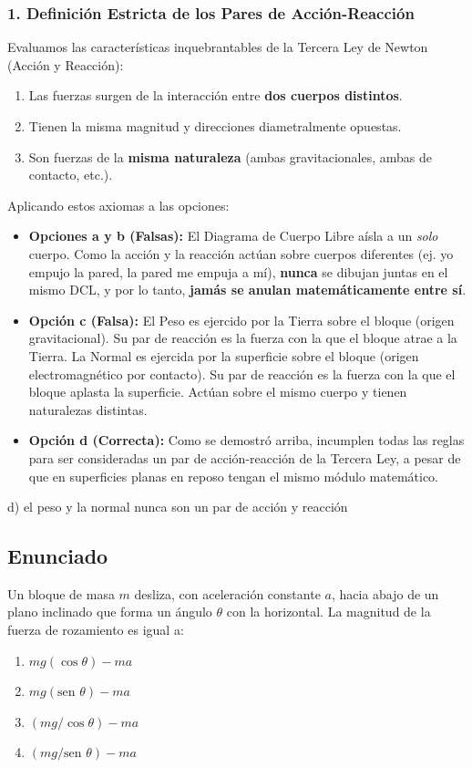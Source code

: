 \documentclass[12pt, a4paper]{article}
\begin{document}
\subsubsection*{1. Definición Estricta de los Pares de Acción-Reacción}
Evaluamos las características inquebrantables de la Tercera Ley de Newton (Acción y Reacción):
\begin{enumerate}
    \item Las fuerzas surgen de la interacción entre \textbf{dos cuerpos distintos}.
    \item Tienen la misma magnitud y direcciones diametralmente opuestas.
    \item Son fuerzas de la \textbf{misma naturaleza} (ambas gravitacionales, ambas de contacto, etc.).
\end{enumerate}

Aplicando estos axiomas a las opciones:
\begin{itemize}
    \item \textbf{Opciones a y b (Falsas):} El Diagrama de Cuerpo Libre aísla a un \textit{solo} cuerpo. Como la acción y la reacción actúan sobre cuerpos diferentes (ej. yo empujo la pared, la pared me empuja a mí), \textbf{nunca} se dibujan juntas en el mismo DCL, y por lo tanto, \textbf{jamás se anulan matemáticamente entre sí}.
    \item \textbf{Opción c (Falsa):} El Peso es ejercido por la Tierra sobre el bloque (origen gravitacional). Su par de reacción es la fuerza con la que el bloque atrae a la Tierra. La Normal es ejercida por la superficie sobre el bloque (origen electromagnético por contacto). Su par de reacción es la fuerza con la que el bloque aplasta la superficie. Actúan sobre el mismo cuerpo y tienen naturalezas distintas. 
    \item \textbf{Opción d (Correcta):} Como se demostró arriba, incumplen todas las reglas para ser consideradas un par de acción-reacción de la Tercera Ley, a pesar de que en superficies planas en reposo tengan el mismo módulo matemático.
\end{itemize}

\begin{tcolorbox}[colback=green!5!white, colframe=green!50!black, title=Respuesta Final]
\centering \Large d) el peso y la normal nunca son un par de acción y reacción
\end{tcolorbox}

\newpage

\subsection*{Enunciado}
Un bloque de masa $m$ desliza, con aceleración constante $a$, hacia abajo de un plano inclinado que forma un ángulo $\theta$ con la horizontal. La magnitud de la fuerza de rozamiento es igual a:
\begin{enumerate}[label=\alph*)]
    \item $mg (\cos \theta) - ma$
    \item $mg (\text{sen } \theta) - ma$
    \item $(mg/\cos \theta) - ma$
    \item $(mg/\text{sen } \theta) - ma$
\end{enumerate}
\end{document}
